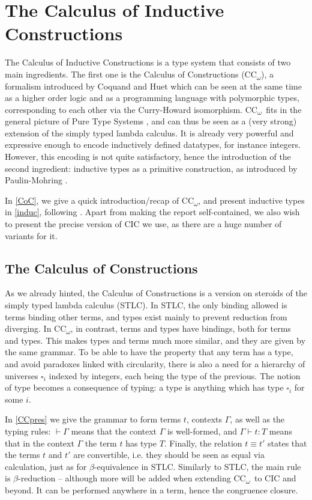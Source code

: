 \documentclass{kaobook}
\newcommand{\uni}[1][]{\square_{#1}}
\newcommand{\conv}{\equiv}
\DeclareMathOperator{\?}{?}
\newcommand{\coc}{CC\textsubscript{$\omega$}}
\begin{document}
{\section{The Calculus of Inductive Constructions}
\label{CIC}

The Calculus of Inductive Constructions is a type system that consists of two main ingredients.
The first one is the Calculus of Constructions (\coc), a formalism introduced by Coquand and Huet \cite{Coquand1988} which can be seen at the same time as a higher order logic and as a programming language with polymorphic types, corresponding to each other via the Curry-Howard isomorphism. \coc\ fits in the general picture of Pure Type Systems \cite{Barendregt1991}, and can thus be seen as a (very strong) extension of the simply typed lambda calculus.
It is already very powerful and expressive enough to encode inductively defined datatypes, for instance integers. However, this encoding is not quite satisfactory, hence the introduction of the second ingredient: inductive types as a primitive construction, as introduced by Paulin-Mohring \cite{Paulin-Mohring1993}.

In \autoref{CoC}, we give a quick introduction/recap of \coc, and present inductive types in \autoref{induc}, following \cite{Paulin-Mohring2015}. Apart from making the report self-contained, we also wish to present the precise version of CIC we use, as there are a huge number of variants for it.


\subsection{The Calculus of Constructions}
\label{CoC}

As we already hinted, the Calculus of Constructions is a version on steroids of the simply typed lambda calculus (STLC). In STLC, the only binding allowed is terms binding other terms, and types exist mainly to prevent reduction from diverging. In \coc, in contrast, terms and types have bindings, both for terms and types. This makes types and terms much more similar, and they are given by the same grammar. To be able to have the property that any term has a type, and avoid paradoxes linked with circularity, there is also a need for a hierarchy of universes $\uni[i]$ indexed by integers, each being the type of the previous. The notion of type becomes a consequence of typing: a type is anything which has type $\uni[i]$ for some $i$.

In \autoref{CCpres} we give the grammar to form terms $t$, contexts $\Gamma$, as well as the typing rules: $\vdash \Gamma$ means that the context $\Gamma$ is well-formed, and $\Gamma \vdash t : T$ means that in the context $\Gamma$ the term $t$ has type $T$. Finally, the relation $t \conv t'$ states that the terms $t$ and $t'$ are convertible, i.e. they should be seen as equal via calculation, just as for $\beta$-equivalence in STLC. Similarly to STLC, the main rule is $\beta$-reduction – although more will be added when extending \coc\ to CIC and beyond. It can be performed anywhere in a term, hence the congruence closure.

}
\end{document}

